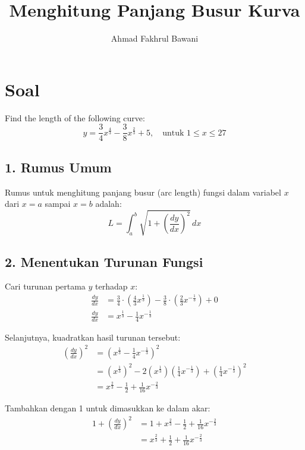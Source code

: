 \documentclass[12pt,a4paper]{article}
\title{Menghitung Panjang Busur Kurva}
\author{Ahmad Fakhrul Bawani}
\date{}
\begin{document}
\maketitle

\section*{Soal}

Find the length of the following curve:
\begin{equation*}
  y = \frac{3}{4}x^{\frac{4}{3}} - \frac{3}{8}x^{\frac{2}{3}} + 5, \quad \text{untuk } 1 \le x \le 27
\end{equation*}

\subsection*{1. Rumus Umum}
Rumus untuk menghitung panjang busur (arc length) fungsi dalam variabel $x$ dari $x = a$ sampai $x = b$ adalah:
\begin{equation*}
  L = \int_{a}^{b} \sqrt{1 + \left(\frac{dy}{dx}\right)^2} \, dx
\end{equation*}

\subsection*{2. Menentukan Turunan Fungsi}
Cari turunan pertama $y$ terhadap $x$:
\begin{align*}
  \frac{dy}{dx} &= \frac{3}{4} \cdot \left(\frac{4}{3}x^{\frac{1}{3}}\right) - \frac{3}{8} \cdot \left(\frac{2}{3}x^{-\frac{1}{3}}\right) + 0 \\
  \frac{dy}{dx} &= x^{\frac{1}{3}} - \frac{1}{4}x^{-\frac{1}{3}}
\end{align*}

Selanjutnya, kuadratkan hasil turunan tersebut:
\begin{align*}
  \left(\frac{dy}{dx}\right)^2 &= \left(x^{\frac{1}{3}} - \frac{1}{4}x^{-\frac{1}{3}}\right)^2 \\
  &= \left(x^{\frac{1}{3}}\right)^2 - 2\left(x^{\frac{1}{3}}\right)\left(\frac{1}{4}x^{-\frac{1}{3}}\right) + \left(\frac{1}{4}x^{-\frac{1}{3}}\right)^2 \\
  &= x^{\frac{2}{3}} - \frac{1}{2} + \frac{1}{16}x^{-\frac{2}{3}}
\end{align*}

Tambahkan dengan 1 untuk dimasukkan ke dalam akar:
\begin{align*}
  1 + \left(\frac{dy}{dx}\right)^2 &= 1 + x^{\frac{2}{3}} - \frac{1}{2} + \frac{1}{16}x^{-\frac{2}{3}} \\
  &= x^{\frac{2}{3}} + \frac{1}{2} + \frac{1}{16}x^{-\frac{2}{3}}
\end{align*}
\end{document}
